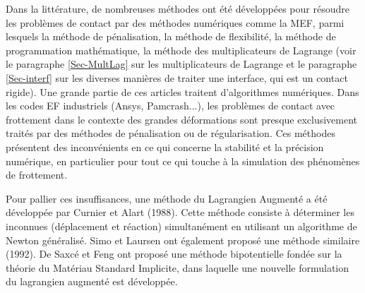 \medskip
{}

\medskip
Dans la littérature, de nombreuses méthodes ont été développées pour résoudre les problèmes 
de contact par des méthodes numériques comme la MEF, parmi lesquels la méthode de pénalisation, 
la méthode de flexibilité, la méthode de programmation mathématique, la méthode des 
multiplicateurs de 
Lagrange 
(voir le paragraphe \ref{Sec-MultLag} sur les multiplicateurs de Lagrange et le
paragraphe \ref{Sec-interf} sur les diverses manières de traiter une interface, qui est un
contact rigide).
Une grande partie de ces articles traitent d'algorithmes numériques. 
Dans les codes EF industriels (Ansys, Pamcrash...), les problèmes de contact avec frottement dans le 
contexte des grandes déformations sont presque exclusivement traités par des méthodes de pénalisation 
ou de régularisation. Ces méthodes présentent des inconvénients en ce qui concerne la stabilité 
et la précision numérique, en particulier pour tout ce qui touche à la simulation des phénomènes de 
frottement.

\medskip
Pour pallier ces insuffisances, une méthode du Lagrangien Augmenté a été développée par 
Curnier et Alart (1988).
Cette méthode consiste à déterminer les inconnues (déplacement et réaction) simultanément en 
utilisant un algorithme de Newton généralisé. 
Simo et 
Laursen ont également proposé une méthode similaire (1992). 
De Saxcé et 
Feng ont proposé une méthode bipotentielle fondée 
sur la théorie du Matériau Standard Implicite, dans laquelle une nouvelle formulation du lagrangien 
augmenté est développée. 


